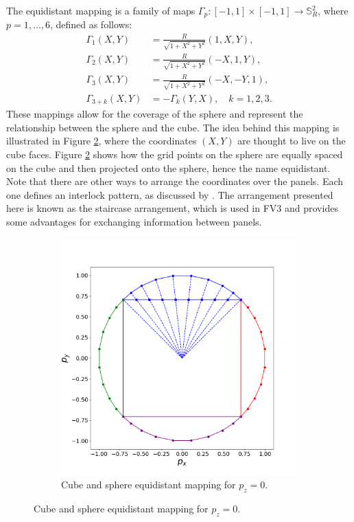 \documentclass[preprint,12pt]{elsarticle}
\begin{document}
\begin{linenumbers}
The equidistant mapping is a family of maps ${\Gamma}_{p}: [-1,1] \times [-1,1] \to \mathbb{S}^2_R$, where $p=1, \ldots, 6$, defined as follows:
\begin{align}
	\label{gamma_1}
	{\Gamma}_{1}(X,Y) &= \frac{R}{\sqrt{1 + X^2 + Y^2}}(1, X, Y),\\ 
	\label{gamma_2}
	{\Gamma}_{2}(X,Y) &= \frac{R}{\sqrt{1 + X^2 + Y^2}}(-X, 1, Y), \\
	\label{gamma_3}
	{\Gamma}_{3}(X,Y) &= \frac{R}{\sqrt{1 + X^2 + Y^2}}(-X, -Y, 1), \\
	\label{gamma_456}
{\Gamma}_{3+k}(X,Y)&=-{\Gamma}_{k}(Y,X),\quad k=1,2,3.
\end{align}
These mappings allow for the coverage of the sphere and represent the relationship between the sphere and the cube.
The idea behind this mapping is illustrated in Figure \ref{sph-cube-equidist}, where the coordinates $(X,Y)$ are thought to live on the cube faces.
Figure \ref{sph-cube-equidist} shows how the grid points on the sphere are equally spaced on the cube and then projected onto the sphere, hence the name equidistant.
Note that there are other ways to arrange the coordinates over the panels.
Each one defines an interlock pattern, as discussed by \cite[Section 2.1]{chen:2021}.
The arrangement presented here is known as the staircase arrangement, which is used in FV3 and provides some advantages for exchanging information between panels.
\begin{figure}[!htb]
	\centering
	\begin{subfigure}{0.45\textwidth}
		\centering
		\includegraphics[width=1.1\linewidth]{g1}
		\caption{Cube and sphere equidistant mapping for $p_z=0$.\label{sph-cube-equidist}}
	\end{subfigure}



\end{figure}
\end{linenumbers}
\end{document}
